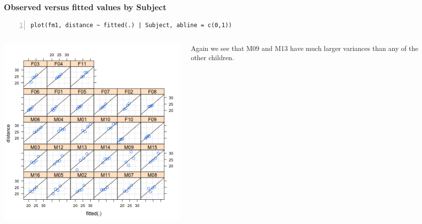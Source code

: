 \documentclass{beamer}
\begin{document}
\begin{frame}[fragile]
    \frametitle{Observed versus fitted values by Subject}
    \scriptsize\begin{Verbatim}[numbers=left,numbersep=6pt,frame=single]
plot(fm1, distance ~ fitted(.) | Subject, abline = c(0,1))
    \end{Verbatim}
    \begin{columns}
        \begin{column}{0.6\textwidth}
            \includegraphics[width=\textwidth]{lectures/day_7_diagnostics_of_mems/figures/unnamed-chunk-37-1.png}
        \end{column}
        \begin{column}{0.4\textwidth}
        \normalsize
            Again we see that M09 and M13 have much larger variances than any of the other children.
        \end{column}
    \end{columns}
\end{frame}
\end{document}
